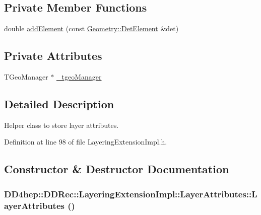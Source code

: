 \subsection*{Private Member Functions}
\begin{DoxyCompactItemize}
\item 
double \hyperlink{struct_d_d4hep_1_1_d_d_rec_1_1_layering_extension_impl_1_1_layer_attributes_a39fc239560d87538d35e8e5051b9b0aa}{addElement} (const \hyperlink{class_d_d4hep_1_1_geometry_1_1_det_element}{Geometry::DetElement} \&det)
\end{DoxyCompactItemize}
\subsection*{Private Attributes}
\begin{DoxyCompactItemize}
\item 
TGeoManager $\ast$ \hyperlink{struct_d_d4hep_1_1_d_d_rec_1_1_layering_extension_impl_1_1_layer_attributes_a14263508e7633f4d41ea796eea116f1e}{\_\-tgeoManager}
\end{DoxyCompactItemize}


\subsection{Detailed Description}
Helper class to store layer attributes. 

Definition at line 98 of file LayeringExtensionImpl.h.

\subsection{Constructor \& Destructor Documentation}
\hypertarget{struct_d_d4hep_1_1_d_d_rec_1_1_layering_extension_impl_1_1_layer_attributes_a74da79c055a10ae02187e41717de53d6}{
\subsubsection[{LayerAttributes}]{\setlength{\rightskip}{0pt plus 5cm}DD4hep::DDRec::LayeringExtensionImpl::LayerAttributes::LayerAttributes ()}}
\label{struct_d_d4hep_1_1_d_d_rec_1_1_layering_extension_impl_1_1_layer_attributes_a74da79c055a10ae02187e41717de53d6}



